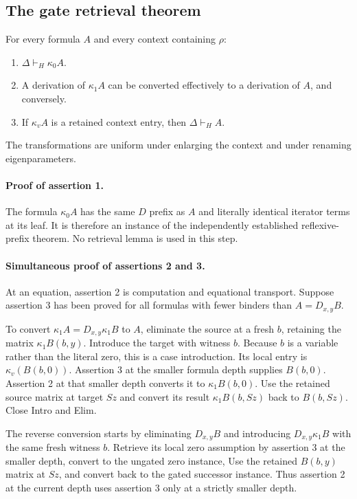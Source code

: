 \subsection{The gate retrieval theorem}
\label{subsec:gate-retrieval}

For every formula $A$ and every context containing $\rho$:
\begin{enumerate}
\item $\Delta\vdash_H\kappa_0A$.
\item A derivation of $\kappa_1A$ can be converted effectively to a
      derivation of $A$, and conversely.
\item If $\kappa_vA$ is a retained context entry, then
      $\Delta\vdash_H A$.
\end{enumerate}
The transformations are uniform under enlarging the context and under
renaming eigenparameters.

\paragraph{Proof of assertion 1.}
The formula $\kappa_0A$ has the same $D$ prefix as $A$ and literally
identical iterator terms at its leaf.  It is therefore an instance of
the independently established reflexive-prefix theorem.  No retrieval
lemma is used in this step.

\paragraph{Simultaneous proof of assertions 2 and 3.}
At an equation, assertion 2 is computation and equational transport.  Suppose assertion 3 has been proved for all formulas with
fewer binders than $A=D_{x,y}B$.

To convert $\kappa_1A=D_{x,y}\kappa_1B$ to $A$, eliminate the source
at a fresh $b$, retaining the matrix $\kappa_1B(b,y)$.  Introduce the
target with witness $b$.  Because $b$ is a variable rather than the
literal zero, this is a case introduction.  Its local entry is
$\kappa_v(B(b,0))$.  Assertion 3 at the smaller formula depth supplies
$B(b,0)$.  Assertion 2 at that smaller depth converts it to
$\kappa_1B(b,0)$.  Use the retained source matrix at target $Sz$ and
convert its result $\kappa_1B(b,Sz)$ back to $B(b,Sz)$.  Close Intro
and Elim.

The reverse conversion starts by eliminating $D_{x,y}B$ and introducing
$D_{x,y}\kappa_1B$ with the same fresh witness $b$.  Retrieve its local
zero assumption by assertion 3 at the smaller depth, convert to the
ungated zero instance, Use the retained $B(b,y)$ matrix at $Sz$, and
convert back to the gated successor instance.  Thus assertion 2 at the
current depth uses assertion 3 only at a strictly smaller depth.

